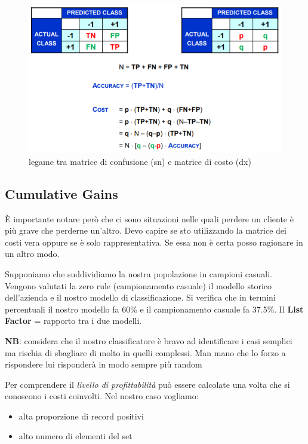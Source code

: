 \begin{figure}[h!]
	\centering
	\includegraphics[height=0.55 \linewidth]{pict/matr_costo.png}
	\caption{legame tra matrice di confusione (sn) e matrice di costo (dx)}
\end{figure}

\subsection{Cumulative Gains}
\`E importante notare per\`o che ci sono situazioni nelle quali perdere un cliente \`e pi\`u grave che perderne un'altro. Devo capire se sto utilizzando la matrice dei costi vera oppure se \`e solo rappresentativa. Se essa non \`e certa posso ragionare in un altro modo. 

Supponiamo che suddividiamo la nostra popolazione in campioni casuali. Vengono valutati la zero rule (campionamento casuale) il modello storico dell'azienda e il nostro modello di classificazione. Si verifica che in termini percentuali il nostro modello fa 60\% e il campionamento casuale fa 37.5\%. 
Il \textbf{List Factor} = rapporto tra i due modelli. 

\textbf{NB}: considera che il nostro classificatore \`e bravo ad identificare i casi semplici ma rischia di sbagliare di molto in quelli complessi. Man mano che lo forzo a rispondere lui risponder\`a in modo sempre pi\`u random

Per comprendere il \textit{livello di profittabilit\`a} pu\`o essere calcolate una volta che si conoscono i costi coinvolti. Nel nostro caso vogliamo:
\begin{itemize}
	\item alta proporzione di record positivi
	\item alto numero di elementi del set
\end{itemize}

